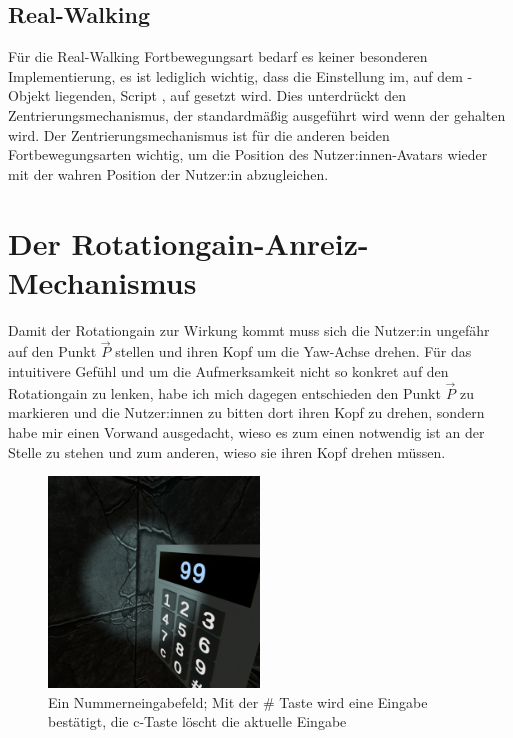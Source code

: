 \subsection{Real-Walking}\label{subsec:real-walk-implementation}
    Für die Real-Walking Fortbewegungsart bedarf es keiner besonderen Implementierung, es ist lediglich wichtig, dass die Einstellung  im, auf dem -Objekt
    liegenden, Script , auf  gesetzt wird. Dies unterdrückt den Zentrierungsmechanismus, der standardmäßig ausgeführt wird wenn der  gehalten wird. Der Zentrierungsmechanismus ist für die anderen beiden Fortbewegungsarten wichtig, um die Position des Nutzer:innen-Avatars wieder mit der wahren Position der Nutzer:in abzugleichen.

\section{Der Rotationgain-Anreiz-Mechanismus}
\label{sec:rotgaininc}

Damit der Rotationgain zur Wirkung kommt muss sich die Nutzer:in ungefähr auf den Punkt $\vec{P}$ stellen und ihren Kopf um die Yaw-Achse drehen.
Für das intuitivere Gefühl und um die Aufmerksamkeit nicht so konkret auf den Rotationgain zu lenken, habe ich mich dagegen entschieden den Punkt $\vec{P}$ zu markieren und die Nutzer:innen zu bitten dort ihren Kopf zu drehen, sondern habe mir einen Vorwand ausgedacht, wieso es zum einen notwendig ist an der Stelle zu stehen und zum anderen, wieso sie ihren Kopf drehen müssen.

\begin{figure}[!h]
    \centering
    \includegraphics[width=0.5\textwidth]{vrscreenshots/numpad.jpg}
    \caption{Ein Nummerneingabefeld; Mit der \# Taste wird eine Eingabe bestätigt, die c-Taste löscht die aktuelle Eingabe}\label{figure:numpad}
\end{figure}

